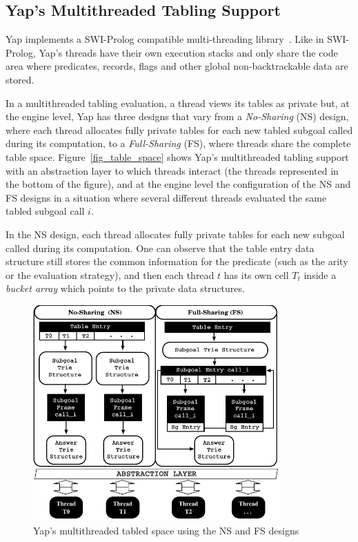 \documentclass{llncs}
\begin{document}
\subsection{Yap's Multithreaded Tabling Support}

Yap implements a SWI-Prolog compatible multi-threading
library~\cite{Wielemaker-03}. Like in SWI-Prolog, Yap's threads have
their own execution stacks and only share the code area where
predicates, records, flags and other global non-backtrackable data are
stored. 

In a multithreaded tabling evaluation, a thread views its tables as
private but, at the engine level, Yap has three designs that vary from
a \emph{No-Sharing} (NS) design, where each thread allocates fully
private tables for each new tabled subgoal called during its
computation, to a \emph{Full-Sharing} (FS), where threads share the
complete table space. Figure~\ref{fig_table_space} shows Yap's
multithreaded tabling support with an abstraction layer to which
threads interact (the threads represented in the bottom of the
figure), and at the engine level the configuration of the NS and FS
designs in a situation where several different threads evaluated the
same tabled subgoal call $i$. 

In the NS design, each thread allocates fully private tables for each
new subgoal called during its computation. One can observe that the
table entry data structure still stores the common information for the
predicate (such as the arity or the evaluation strategy), and then
each thread $t$ has its own cell $T_t$ inside a \emph{bucket array}
which points to the private data structures.

\begin{figure}[!ht]
\vspace{-\intextsep}
\centering
\includegraphics[width=9.5cm]{figures/yap-mt.pdf}
\caption{Yap's multithreaded tabled space using the NS and FS designs}
\label{fig_yap_mt_support}
\vspace{-1.0\intextsep}
\end{figure}
\end{document}
